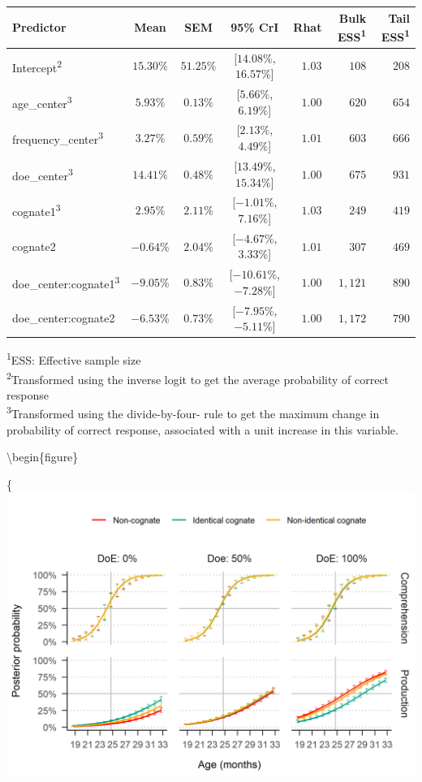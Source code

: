 \documentclass[
  english,
  man,man,floatsintext]{apa6}
\begin{document}
\captionsetup[table]{labelformat=empty,skip=1pt}
\begin{longtable}{lcccrrr}
\toprule
\textbf{Predictor} & \textbf{Mean} & \textbf{SEM} & \textbf{95\% CrI} & \textbf{Rhat} & \textbf{Bulk ESS}\textsuperscript{1} & \textbf{Tail ESS}\textsuperscript{1} \\ 
\midrule
Intercept\textsuperscript{2} & $15.30\%$ & $51.25\%$ & [$14.08\%$, $16.57\%$] & $1.03$ & $108$ & $208$ \\ 
age\_center\textsuperscript{3} & $5.93\%$ & $0.13\%$ & [$5.66\%$, $6.19\%$] & $1.00$ & $620$ & $654$ \\ 
frequency\_center\textsuperscript{3} & $3.27\%$ & $0.59\%$ & [$2.13\%$, $4.49\%$] & $1.01$ & $603$ & $666$ \\ 
doe\_center\textsuperscript{3} & $14.41\%$ & $0.48\%$ & [$13.49\%$, $15.34\%$] & $1.00$ & $675$ & $931$ \\ 
cognate1\textsuperscript{3} & $2.95\%$ & $2.11\%$ & [$-1.01\%$, $7.16\%$] & $1.03$ & $249$ & $419$ \\ 
cognate2 & $-0.64\%$ & $2.04\%$ & [$-4.67\%$, $3.33\%$] & $1.01$ & $307$ & $469$ \\ 
doe\_center:cognate1\textsuperscript{3} & $-9.05\%$ & $0.83\%$ & [$-10.61\%$, $-7.28\%$] & $1.00$ & $1,121$ & $890$ \\ 
doe\_center:cognate2 & $-6.53\%$ & $0.73\%$ & [$-7.95\%$, $-5.11\%$] & $1.00$ & $1,172$ & $790$ \\ 
\bottomrule
\end{longtable}
\vspace{-5mm}
\begin{minipage}{\linewidth}
\textsuperscript{1}ESS: Effective sample size \\ 
\textsuperscript{2}Transformed using the inverse logit to get the average probability of correct response \\ 
\textsuperscript{3}Transformed using the divide-by-four- rule to get the maximum change in probability of correct response, associated with a unit increase in this variable. \\ 
\end{minipage}

\textbackslash begin\{figure\}

\{\centering \includegraphics[width=0.8\linewidth]{manuscript_files/figure-latex/emmeans-1}
\end{document}
